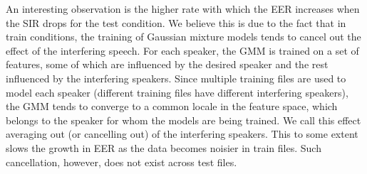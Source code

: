 An interesting observation is the higher rate with which the EER increases when the SIR drops for the test condition. 
We believe this is due to the fact that in train conditions, the training of Gaussian mixture models tends to cancel out the effect of the interfering speech. 
For each speaker, the GMM is trained on a set of features, some of which are influenced by the desired speaker and the rest influenced by the interfering speakers. 
Since multiple training files are used to model each speaker (different training files have different interfering speakers), the GMM tends to converge to a common locale in the feature space, which belongs to the speaker for whom the models are being trained. 
We call this effect averaging out (or cancelling out) of the interfering speakers. 
This to some extent slows the growth in EER as the data becomes noisier in train files. 
Such cancellation, however, does not exist across test files.



